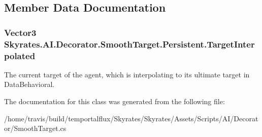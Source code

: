 \subsection{Member Data Documentation}
\hypertarget{class_skyrates_1_1_a_i_1_1_decorator_1_1_smooth_target_1_1_persistent_a95095b4965ea0dd073ff586168650f6e}{
\subsubsection[{Target\-Interpolated}]{\setlength{\rightskip}{0pt plus 5cm}Vector3 Skyrates.\-A\-I.\-Decorator.\-Smooth\-Target.\-Persistent.\-Target\-Interpolated}}\label{class_skyrates_1_1_a_i_1_1_decorator_1_1_smooth_target_1_1_persistent_a95095b4965ea0dd073ff586168650f6e}


The current target of the agent, which is interpolating to its ultimate target in Data\-Behavioral. 



The documentation for this class was generated from the following file\-:\begin{DoxyCompactItemize}
\item 
/home/travis/build/temportalflux/\-Skyrates/\-Skyrates/\-Assets/\-Scripts/\-A\-I/\-Decorator/Smooth\-Target.\-cs\end{DoxyCompactItemize}

